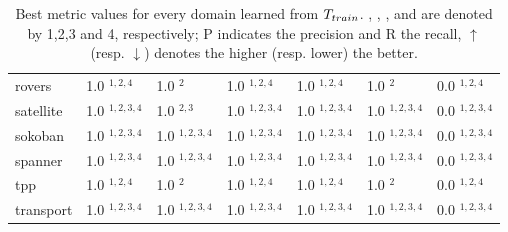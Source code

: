 \begin{table}[ht!]
{\begin{tabular}{|l|l|l|l|l|l|l|}
rovers & 1.0 $^{1,2,4}$ & 1.0 $^{2}$ & 1.0 $^{1,2,4}$ & 1.0 $^{1,2,4}$ & 1.0 $^{2}$ & 0.0 $^{1,2,4}$ \\
satellite & 1.0 $^{1,2,3,4}$ & 1.0 $^{2,3}$ & 1.0 $^{1,2,3,4}$ & 1.0 $^{1,2,3,4}$ & 1.0 $^{1,2,3,4}$ & 0.0 $^{1,2,3,4}$ \\
sokoban & 1.0 $^{1,2,3,4}$ & 1.0 $^{1,2,3,4}$ & 1.0 $^{1,2,3,4}$ & 1.0 $^{1,2,3,4}$ & 1.0 $^{1,2,3,4}$ & 0.0 $^{1,2,3,4}$ \\
spanner & 1.0 $^{1,2,3,4}$ & 1.0 $^{1,2,3,4}$ & 1.0 $^{1,2,3,4}$ & 1.0 $^{1,2,3,4}$ & 1.0 $^{1,2,3,4}$ & 0.0 $^{1,2,3,4}$ \\
tpp & 1.0 $^{1,2,4}$ & 1.0 $^{2}$ & 1.0 $^{1,2,4}$ & 1.0 $^{1,2,4}$ & 1.0 $^{2}$ & 0.0 $^{1,2,4}$ \\
transport & 1.0 $^{1,2,3,4}$ & 1.0 $^{1,2,3,4}$ & 1.0 $^{1,2,3,4}$ & 1.0 $^{1,2,3,4}$ & 1.0 $^{1,2,3,4}$ & 0.0 $^{1,2,3,4}$ \\
\hline
\end{tabular}
}
\caption{Best metric values for every domain learned from $T_{train}$. \sam, \offlam, \rosame, and \nolam are denoted by 1,2,3 and 4, respectively; P indicates the precision and R the recall, $\uparrow$ (resp. $\downarrow$) denotes the higher (resp. lower) the better.
}
\label{tab:best-10traces}
\end{table}
